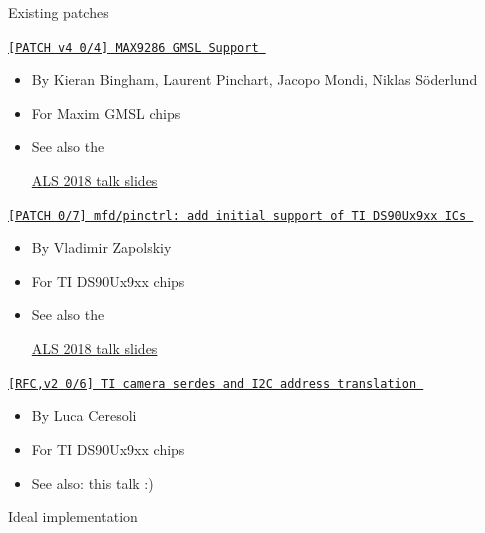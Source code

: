\documentclass[xetex,table,aspectratio=169]{beamer}
\newcommand{\myhref}[2]{
  \href{#1}{#2 {\tiny\faExternalLink{}}}
}
\begin{document}
\begin{frame}{Existing patches}
  \myhref{https://lore.kernel.org/linux-media/20181102154723.23662-1-kieran.bingham@ideasonboard.com/}
         {\tt [PATCH v4 0/4] MAX9286 GMSL Support}
  \begin{itemize}
  \item By Kieran Bingham, Laurent Pinchart, Jacopo Mondi, Niklas Söderlund
  \item For Maxim GMSL chips
  \item See also the
    \myhref{https://www.slideshare.net/KieranBingham/gmsl-in-linux}
           {ALS 2018 talk slides}
  \end{itemize}

  \pause
  \myhref{https://lore.kernel.org/linux-media/20181008211205.2900-1-vz@mleia.com/}
         {\tt [PATCH 0/7] mfd/pinctrl: add initial support of TI DS90Ux9xx ICs}
  \begin{itemize}
  \item By Vladimir Zapolskiy
  \item For TI DS90Ux9xx chips
  \item See also the
    \myhref{https://schd.ws/hosted_files/ossalsjp18/8a/vzapolskiy_als2018.pdf}
           {ALS 2018 talk slides}
  \end{itemize}

  \pause
  \myhref{https://lore.kernel.org/linux-media/20190723203723.11730-1-luca@lucaceresoli.net/}
         {\tt [RFC,v2 0/6] TI camera serdes and I2C address translation}
  \begin{itemize}
  \item By Luca Ceresoli
  \item For TI DS90Ux9xx chips
  \item See also: this talk :)
  \end{itemize}
\end{frame}

\begin{frame}{Ideal implementation}
\begin{center}
\end{center}
\end{frame}
\end{document}
